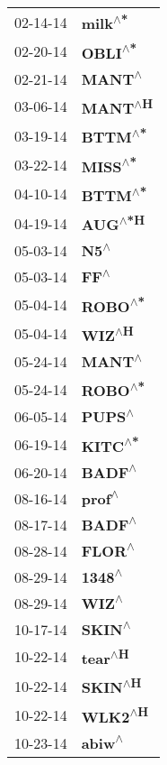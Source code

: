 \begin{supertabular}{p{0.08\textwidth}p{0.2\textwidth}}
 02-14-14 &   \textbf{milk\textsuperscript{$\wedge$*}} \\
 02-20-14 &   \textbf{OBLI\textsuperscript{$\wedge$*}} \\
 02-21-14 &    \textbf{MANT\textsuperscript{$\wedge$}} \\
 03-06-14 &   \textbf{MANT\textsuperscript{$\wedge$H}} \\
 03-19-14 &   \textbf{BTTM\textsuperscript{$\wedge$*}} \\
 03-22-14 &   \textbf{MISS\textsuperscript{$\wedge$*}} \\
 04-10-14 &   \textbf{BTTM\textsuperscript{$\wedge$*}} \\
 04-19-14 &   \textbf{AUG\textsuperscript{$\wedge$*H}} \\
 05-03-14 &      \textbf{N5\textsuperscript{$\wedge$}} \\
 05-03-14 &      \textbf{FF\textsuperscript{$\wedge$}} \\
 05-04-14 &   \textbf{ROBO\textsuperscript{$\wedge$*}} \\
 05-04-14 &    \textbf{WIZ\textsuperscript{$\wedge$H}} \\
 05-24-14 &    \textbf{MANT\textsuperscript{$\wedge$}} \\
 05-24-14 &   \textbf{ROBO\textsuperscript{$\wedge$*}} \\
 06-05-14 &    \textbf{PUPS\textsuperscript{$\wedge$}} \\
 06-19-14 &   \textbf{KITC\textsuperscript{$\wedge$*}} \\
 06-20-14 &    \textbf{BADF\textsuperscript{$\wedge$}} \\
 08-16-14 &    \textbf{prof\textsuperscript{$\wedge$}} \\
 08-17-14 &    \textbf{BADF\textsuperscript{$\wedge$}} \\
 08-28-14 &    \textbf{FLOR\textsuperscript{$\wedge$}} \\
 08-29-14 &    \textbf{1348\textsuperscript{$\wedge$}} \\
 08-29-14 &     \textbf{WIZ\textsuperscript{$\wedge$}} \\
 10-17-14 &    \textbf{SKIN\textsuperscript{$\wedge$}} \\
 10-22-14 &   \textbf{tear\textsuperscript{$\wedge$H}} \\
 10-22-14 &   \textbf{SKIN\textsuperscript{$\wedge$H}} \\
 10-22-14 &   \textbf{WLK2\textsuperscript{$\wedge$H}} \\
 10-23-14 &    \textbf{abiw\textsuperscript{$\wedge$}} \\

\end{supertabular}
